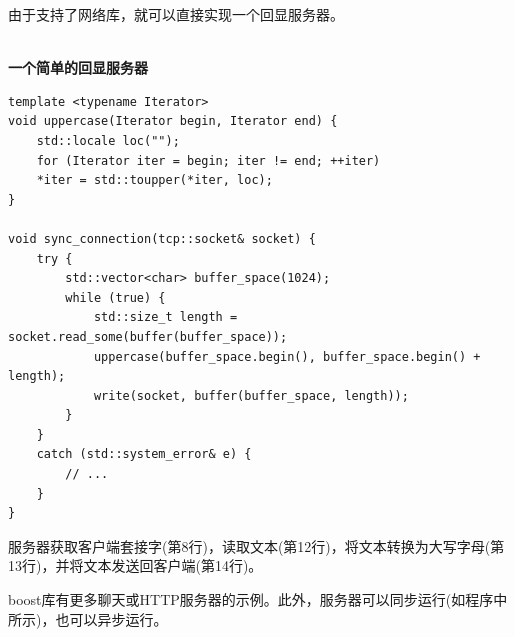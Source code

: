 由于支持了网络库，就可以直接实现一个回显服务器。

\hspace*{\fill} \\ %
\noindent
\textbf{一个简单的回显服务器}
\begin{lstlisting}[style=styleCXX]
template <typename Iterator>
void uppercase(Iterator begin, Iterator end) {
	std::locale loc("");
	for (Iterator iter = begin; iter != end; ++iter)
	*iter = std::toupper(*iter, loc);
}

void sync_connection(tcp::socket& socket) {
	try {
		std::vector<char> buffer_space(1024);
		while (true) {
			std::size_t length = socket.read_some(buffer(buffer_space));
			uppercase(buffer_space.begin(), buffer_space.begin() + length);
			write(socket, buffer(buffer_space, length));
		}
	}
	catch (std::system_error& e) {
		// ...
	}
}
\end{lstlisting}

服务器获取客户端套接字(第8行)，读取文本(第12行)，将文本转换为大写字母(第13行)，并将文本发送回客户端(第14行)。

boost库有更多聊天或HTTP服务器的示例。此外，服务器可以同步运行(如程序中所示)，也可以异步运行。






















